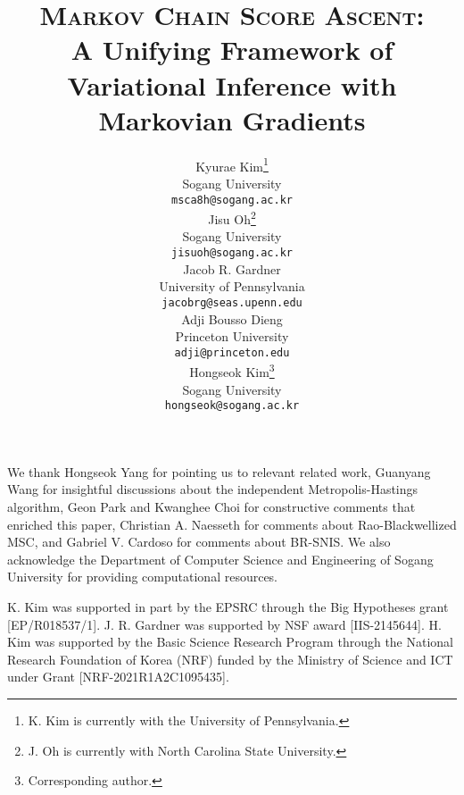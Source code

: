 \documentclass{article}
\title{\textsc{Markov Chain Score Ascent}: \\ A Unifying Framework of \\ Variational Inference with Markovian Gradients}
\author{%
  Kyurae Kim\thanks{K. Kim is currently with the University of Pennsylvania.} \\
  Sogang University\\
  \texttt{msca8h@sogang.ac.kr} \\
  \And
  Jisu Oh\thanks{J. Oh is currently with North Carolina State University.} \\
  Sogang University \\
  \texttt{jisuoh@sogang.ac.kr} \\
  \AND
  Jacob R. Gardner  \\
  University of Pennsylvania \\
  \texttt{jacobrg@seas.upenn.edu} \\
  \And
  Adji Bousso Dieng \\
  Princeton University \\
  \texttt{adji@princeton.edu} \\
  \And
  Hongseok Kim\thanks{Corresponding author.} \\
  Sogang University \\
  \texttt{hongseok@sogang.ac.kr} \\
}
\begin{document}
\maketitle

\begin{abstract}
  
\end{abstract}









\vspace{-2ex}
\begin{ack}
\vspace{-2ex}
  We thank Hongseok Yang for pointing us to relevant related work, Guanyang Wang for insightful discussions about the independent Metropolis-Hastings algorithm, Geon Park and Kwanghee Choi for constructive comments that enriched this paper, Christian A. Naesseth for comments about Rao-Blackwellized MSC, and Gabriel V. Cardoso for comments about BR-SNIS.
  We also acknowledge the Department of Computer Science and Engineering of Sogang University for providing computational resources.

  K. Kim was supported in part by the EPSRC through the Big Hypotheses grant [EP/R018537/1].
  J. R. Gardner was supported by NSF award [IIS-2145644].
  H. Kim was supported by the Basic Science Research Program through the National Research Foundation of Korea (NRF) funded by the Ministry of Science and ICT under Grant [NRF-2021R1A2C1095435].
\end{ack}

\newpage


\newpage
\appendix

\end{document}
